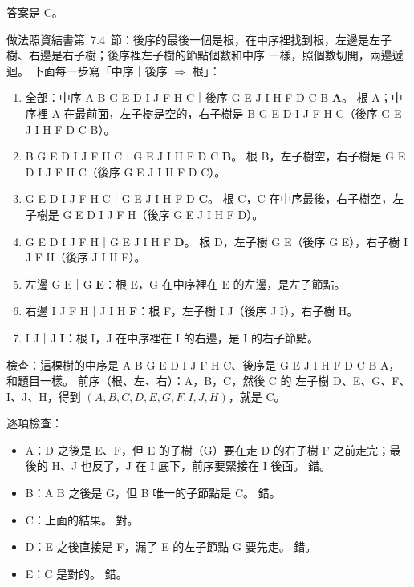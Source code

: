 \begin{pastsoln}
答案是 C。

做法照資結書第~7.4~節：後序的最後一個是根，在中序裡找到根，左邊是左子樹、右邊是右子樹；後序裡左子樹的節點個數和中序
一樣，照個數切開，兩邊遞迴。 下面每一步寫「中序｜後序 $\Rightarrow$ 根」：
\begin{enumerate}
\item 全部：中序 A B G E D I J F H C｜後序 G E J I H F D C B \textbf{A}。 根 A；中序裡 A 在最前面，左子樹是空的，右子樹是
B G E D I J F H C（後序 G E J I H F D C B）。
\item B G E D I J F H C｜G E J I H F D C \textbf{B}。 根 B，左子樹空，右子樹是 G E D I J F H C（後序 G E J I H F D C）。
\item G E D I J F H C｜G E J I H F D \textbf{C}。 根 C，C 在中序最後，右子樹空，左子樹是 G E D I J F H（後序 G E J I H F D）。
\item G E D I J F H｜G E J I H F \textbf{D}。 根 D，左子樹 G E（後序 G E），右子樹 I J F H（後序 J I H F）。
\item 左邊 G E｜G \textbf{E}：根 E，G 在中序裡在 E 的左邊，是左子節點。
\item 右邊 I J F H｜J I H \textbf{F}：根 F，左子樹 I J（後序 J I），右子樹 H。
\item I J｜J \textbf{I}：根 I，J 在中序裡在 I 的右邊，是 I 的右子節點。
\end{enumerate}
\begin{center}
\end{center}
檢查：這棵樹的中序是 A B G E D I J F H C、後序是 G E J I H F D C B A，和題目一樣。 前序（根、左、右）：A，B，C，然後 C 的
左子樹 D、E、G、F、I、J、H，得到 $(A, B, C, D, E, G, F, I, J, H)$，就是 C。

逐項檢查：
\begin{itemize}
\item A：D 之後是 E、F，但 E 的子樹（G）要在走 D 的右子樹 F 之前走完；最後的 H、J 也反了，J 在 I 底下，前序要緊接在 I 後面。 錯。
\item B：A B 之後是 G，但 B 唯一的子節點是 C。 錯。
\item C：上面的結果。 對。
\item D：E 之後直接是 F，漏了 E 的左子節點 G 要先走。 錯。
\item E：C 是對的。 錯。
\end{itemize}
\end{pastsoln}
